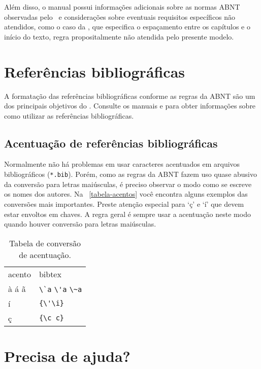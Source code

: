 Além disso, o manual possui informações adicionais sobre as normas ABNT
observadas pelo \abnTeX\ e considerações sobre eventuais requisitos específicos
não atendidos, como o caso da , que
especifica o espaçamento entre os capítulos e o início do texto, regra
propositalmente não atendida pelo presente modelo.

\section{Referências bibliográficas}

A formatação das referências bibliográficas conforme as regras da ABNT são um
dos principais objetivos do \abnTeX. Consulte os manuais
 e  para obter informações
sobre como utilizar as referências bibliográficas.

\subsection{Acentuação de referências bibliográficas}

Normalmente não há problemas em usar caracteres acentuados em arquivos
bibliográficos (\texttt{*.bib}). Porém, como as regras da ABNT fazem uso quase
abusivo da conversão para letras maiúsculas, é preciso observar o modo como se
escreve os nomes dos autores. Na ~\autoref{tabela-acentos} você encontra alguns
exemplos das conversões mais importantes. Preste atenção especial para `ç' e `í'
que devem estar envoltos em chaves. A regra geral é sempre usar a acentuação
neste modo quando houver conversão para letras maiúsculas.

\begin{table}[htbp]
\caption{Tabela de conversão de acentuação.}
\label{tabela-acentos}

\begin{center}
\begin{tabular}{ll}\hline\hline
acento & \textsf{bibtex}\\
à á ã & \verb+\`a+ \verb+\'a+ \verb+\~a+\\
í & \verb+{\'\i}+\\
ç & \verb+{\c c}+\\
\hline\hline
\end{tabular}
\end{center}
\end{table}


\section{Precisa de ajuda?}

